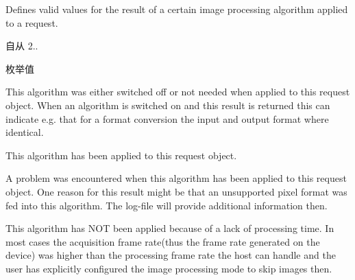 Defines valid values for the result of a certain image processing algorithm applied to a request. 

\begin{DoxySince}{自从}
2.. 
\end{DoxySince}
\begin{Desc}
\item[枚举值]\par
\begin{description}
\item[{\em 
\hypertarget{group___common_interface_ggac868128de70336bbecd2efbb80ee1309ad33ecb32652dc72fe58a6f4b475a901e}{ipr\+Not\+Active}\label{group___common_interface_ggac868128de70336bbecd2efbb80ee1309ad33ecb32652dc72fe58a6f4b475a901e}
}]This algorithm was either switched off or not needed when applied to this request object. When an algorithm is switched on and this result is returned this can indicate e.\+g. that for a format conversion the input and output format where identical. \item[{\em 
\hypertarget{group___common_interface_ggac868128de70336bbecd2efbb80ee1309a3532d000e27d6b280d941e3994ea040d}{ipr\+Applied}\label{group___common_interface_ggac868128de70336bbecd2efbb80ee1309a3532d000e27d6b280d941e3994ea040d}
}]This algorithm has been applied to this request object. \item[{\em 
\hypertarget{group___common_interface_ggac868128de70336bbecd2efbb80ee1309a4a955cd64484e25ac70242c4e33e3f2b}{ipr\+Failure}\label{group___common_interface_ggac868128de70336bbecd2efbb80ee1309a4a955cd64484e25ac70242c4e33e3f2b}
}]A problem was encountered when this algorithm has been applied to this request object. One reason for this result might be that an unsupported pixel format was fed into this algorithm. The log-\/file will provide additional information then. \item[{\em 
\hypertarget{group___common_interface_ggac868128de70336bbecd2efbb80ee1309a28314ccb4b389b376fa7023eb72b5cbb}{ipr\+Skipped}\label{group___common_interface_ggac868128de70336bbecd2efbb80ee1309a28314ccb4b389b376fa7023eb72b5cbb}
}]This algorithm has N\+O\+T been applied because of a lack of processing time. In most cases the acquisition frame rate(thus the frame rate generated on the device) was higher than the processing frame rate the host can handle and the user has explicitly configured the image processing mode to skip images then. \end{description}
\end{Desc}
